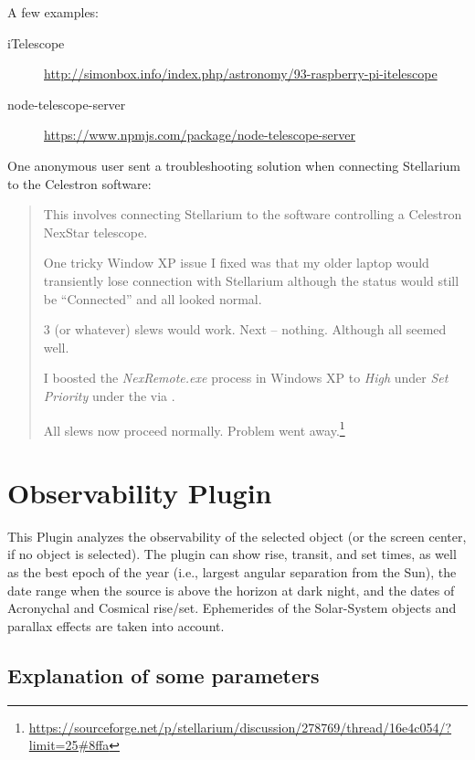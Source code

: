 A few examples:
\begin{description}
\item[iTelescope] \url{http://simonbox.info/index.php/astronomy/93-raspberry-pi-itelescope}
\item[node-telescope-server] \url{https://www.npmjs.com/package/node-telescope-server}
\end{description}

One anonymous user sent a troubleshooting solution when connecting Stellarium to the Celestron  software:
\begin{quote}
  This involves connecting Stellarium to the  software controlling a Celestron NexStar telescope.

  One tricky Window XP issue I fixed was that my older laptop would
  transiently lose connection with Stellarium although the status
  would still be ``Connected'' and all looked normal.

  3 (or whatever) slews would work. Next -- nothing. Although all
  seemed well.

  I boosted the \emph{NexRemote.exe} process in Windows XP to \emph{High} under
  \emph{Set Priority} under the  via
  .

  All slews now proceed normally. Problem went
  away.\footnote{\url{https://sourceforge.net/p/stellarium/discussion/278769/thread/16e4c054/?limit=25\#8ffa}}
\end{quote}


\newpage
\section{Observability Plugin}
\label{sec:plugins:Observability}

This Plugin  analyzes the observability of the selected object (or the
screen center, if no object is selected). The plugin can show rise,
transit, and set times, as well as the best epoch of the year (i.e.,
largest angular separation from the Sun), the date range when the
source is above the horizon at dark night, and the dates of Acronychal
and Cosmical rise/set.  Ephemerides of the Solar-System objects and
parallax effects are taken into account.

\subsection*{Explanation of some parameters}


